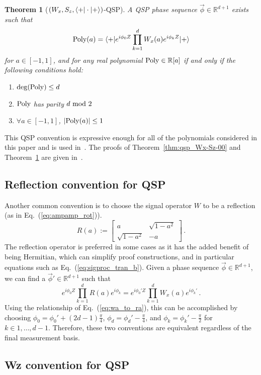 \documentclass[aps,pra,showpacs,notitlepage,twocolumn,superscriptaddress,nofootinbib]{revtex4-1}
\newtheorem{theorem}{Theorem}
\newcommand{\be}{\begin{equation}}
\newcommand{\ee}{\end{equation}}
\newcommand{\mattwocb}[4]{\left[
	\begin{array}{cc}{#1}&{#2}\\{#3}&{#4}\end{array}\right]}
\begin{document}
\begin{theorem}[$(W_x, S_z, \braket{+| \cdot | +})$-QSP]
A QSP phase sequence $\vec\phi \in \mathbb{R}^{d+1}$ exists such that
\begin{equation}\label{eq:qsp_thm_Wx-Sz-++}
    {\rm Poly}(a) = \braket{+ | e^{i \phi_0 Z} \prod_{k=1}^d  W_x(a)  e^{i\phi_k Z} | +}
\end{equation}
for $a\in[-1, 1]$, and for any real polynomial ${\rm Poly} \in \mathbb{R}[a]$ if and only if the following conditions hold:
\begin{enumerate}[label=(\roman*)]
  \item ${\rm deg}({\rm Poly}) \leq d$
  \item ${\rm Poly}$ has parity $d~ {\rm mod}~ 2$
  \item $\forall a \in [-1, 1]$, $|{\rm Poly}(a)| \le 1$
\end{enumerate}
\label{thm:qsp_Wx-Sz-++}
\end{theorem}
This QSP convention is expressive enough for all of the polynomials considered in this paper and is used in~\cite{Low_2016, Gily_n_2019}.
The proofs of Theorem~\ref{thm:qsp_Wx-Sz-00} and Theorem~\ref{thm:qsp_Wx-Sz-++} are given in~\cite{Gily_n_2019}.

\subsection{Reflection convention for QSP}

Another common convention is to choose the signal operator $W$ to be a reflection (as in Eq.~(\ref{eq:ampamp_rot})).
\be
R(a) := \mattwocb{a}{\sqrt{1-a^2}}{\sqrt{1-a^2}}{-a}
\,.
\label{eq:ra_qsp_x}
\ee
The reflection operator is preferred in some cases as it has the added benefit of being Hermitian, which can simplify proof constructions, and in particular equations such as Eq.~(\ref{eq:sigproc_tran_b}). Given a phase sequence $\vec{\phi} \in \mathbb{R}^{d+1}$, we can find a $\vec{\phi}' \in \mathbb{R}^{d+1}$ such that
\be
e^{i \phi_0 Z} \prod_{k=1}^d R(a) e^{i \phi_k} = e^{i \phi_0' Z} \prod_{k=1}^d W_x(a) e^{i \phi_k'}
\,.
\ee
Using the relationship of Eq.~(\ref{eq:wa_to_ra}), this can be accomplished by choosing $\phi_0 = \phi_0' + (2d - 1)\frac{\pi}{4}$, $\phi_d = \phi_d' - \frac{\pi}{4}$, and $\phi_k = \phi_k' - \frac{\pi}{2}$ for $k \in {1, \ldots, d-1}$.
Therefore, these two conventions are equivalent regardless of the final measurement basis. 

\subsection{Wz convention for QSP}
\end{document}
